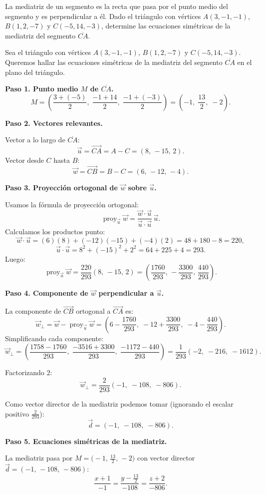 \begin{prob}
La mediatriz de un segmento es la recta que pasa por el punto medio del 
segmento y es perpendicular a él. Dado el triángulo con vértices 
$A(3,-1,-1)$, $B(1,2,-7)$ y $C(-5,14,-3)$, determine las ecuaciones 
simétricas de la mediatriz del segmento $\overline{CA}$.

\begin{myproof}
Sea el triángulo con vértices $A(3,-1,-1)$, $B(1,2,-7)$ y $C(-5,14,-3)$.
Queremos hallar las ecuaciones simétricas de la mediatriz del segmento 
$\overline{CA}$ en el plano del triángulo.

\textbf{Paso 1. Punto medio $M$ de $\overline{CA}$.}
\[
  M = \left(\frac{3+(-5)}{2},\; \frac{-1+14}{2},\; \frac{-1+(-3)}{2}\right)
    = \left(-1,\; \frac{13}{2},\; -2\right).
\]

\textbf{Paso 2. Vectores relevantes.}

Vector a lo largo de $\overline{CA}$:
\[
  \vec{u} = \overrightarrow{CA} = A - C = (8,\,-15,\,2).
\]
Vector desde $C$ hasta $B$:
\[
  \vec{w} = \overrightarrow{CB} = B - C = (6,\,-12,\,-4).
\]

\textbf{Paso 3. Proyección ortogonal de $\vec{w}$ sobre $\vec{u}$.}

Usamos la fórmula de proyección ortogonal:
\[
  \operatorname{proy}_{\vec{u}} \vec{w}
  = \frac{\vec{w}\cdot\vec{u}}{\vec{u}\cdot\vec{u}}\,\vec{u}.
\]
Calculamos los productos punto:
\[
  \vec{w}\cdot\vec{u} = (6)(8)+(-12)(-15)+(-4)(2)
                      = 48 + 180 - 8 = 220,
\]
\[
  \vec{u}\cdot\vec{u} = 8^2+(-15)^2+2^2 = 64+225+4 = 293.
\]
Luego:
\[
  \operatorname{proy}_{\vec{u}}\vec{w}
  = \frac{220}{293}(8,\,-15,\,2)
  = \left(\frac{1760}{293},\,-\frac{3300}{293},\,\frac{440}{293}\right).
\]

\textbf{Paso 4. Componente de $\vec{w}$ perpendicular a $\vec{u}$.}

La componente de $\overrightarrow{CB}$ ortogonal a $\overrightarrow{CA}$ es:
\[
  \vec{w}_{\perp}
  = \vec{w} - \operatorname{proy}_{\vec{u}}\vec{w}
  = \left(6 - \frac{1760}{293},\;
          -12 + \frac{3300}{293},\;
          -4 - \frac{440}{293}\right).
\]
Simplificando cada componente:
\[
  \vec{w}_{\perp}
  = \left(\frac{1758-1760}{293},\;
          \frac{-3516+3300}{293},\;
          \frac{-1172-440}{293}\right)
  = \frac{1}{293}\left(-2,\;-216,\;-1612\right).
\]

Factorizando $2$:
\[
  \vec{w}_{\perp} = \frac{2}{293}\left(-1,\;-108,\;-806\right).
\]

Como vector director de la mediatriz podemos tomar (ignorando el escalar 
positivo $\tfrac{2}{293}$):
\[
  \vec{d} = (-1,\;-108,\;-806).
\]

\textbf{Paso 5. Ecuaciones simétricas de la mediatriz.}

La mediatriz pasa por $M=\bigl(-1,\,\tfrac{13}{2},\,-2\bigr)$ con 
vector director $\vec{d}=(-1,\,-108,\,-806)$:
\[
  \boxed{
    \frac{x+1}{-1} = \frac{y - \tfrac{13}{2}}{-108} = \frac{z+2}{-806}.
  }
\]
\end{myproof}
\end{prob}


